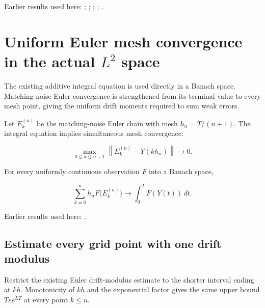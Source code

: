 \documentclass[11pt,a4paper]{report}
\begin{document}
Earlier results used here: \cite[Section~3.11.1]{LangevinLean2026ULASC}; \cite[Section~3.11.3]{LangevinLean2026ULASC}; \cite[Section~3.13.2]{LangevinLean2026ULASC}; \cite[Section~3.13.5]{LangevinLean2026ULASC}; \cite[Section~3.13.6]{LangevinLean2026ULASC}.
\section{\texorpdfstring{Uniform Euler mesh convergence in the actual \(L^{2}\) space}{Uniform Euler mesh convergence in the actual L² space}}
\label{proof-module-AverageLMC-LaplacianEulerLimit-lean}


The existing additive integral equation is used directly in a Banach space. Matching-noise Euler convergence is strengthened from its terminal value to every mesh point, giving the uniform drift moments required to sum weak errors.



Let \(E_k^{(n)}\) be the matching-noise Euler chain with mesh \(h_n=T/(n+1)\). The integral equation implies simultaneous mesh convergence:


\[\max_{0\le k\le n+1}\left\|E_k^{(n)}-Y(kh_n)\right\|
\longrightarrow0.\]


For every uniformly continuous observation \(F\) into a Banach space,


\[\sum_{k=0}^{n}h_nF\bigl(E_k^{(n)}\bigr)
\longrightarrow\int_0^T F(Y(t))\,dt.\]

Earlier results used here: \cite[Section~3.16]{LangevinLean2026ULASC}.
\subsection{\texorpdfstring{Estimate every grid point with one drift modulus}{Estimate every grid point with one drift modulus}}
\label{report-step-AverageLMC-LaplacianEulerLimit-lean-1}


Restrict the existing Euler drift-modulus estimate to the shorter interval ending at \(kh\). Monotonicity of \(kh\) and the exponential factor gives the same upper bound \(T\varepsilon e^{LT}\) at every point \(k\le n\).
\end{document}
